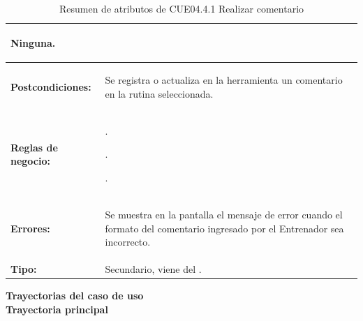 \begin{table}[H]
\begin{tabular}{| l | p{12 cm} |}
\begin{compactitem}
								\item Ninguna.
							\end{compactitem}\\
\hline
\textbf{Postcondiciones:} & \vspace{-2mm}	%
							\begin{compactitem}
								\setlength\itemsep{-0.25em}
								\item Se registra o actualiza en la herramienta un comentario en la rutina seleccionada.
							\end{compactitem}\\
\hline
\textbf{Reglas de negocio:} & \vspace{-2mm}	%
							\begin{compactitem}
								\setlength\itemsep{-0.25em}
								\item \nameref{rn:RNR25}.
								\item \nameref{rn:RNR26}.
								\item \nameref{rn:RNR27}.
								
							\end{compactitem}\\							
\hline
\textbf{Errores:} &	\vspace{-2mm}	%
					\begin{compactitem}
						\setlength\itemsep{-0.25em}
						\item Se muestra en la pantalla \nameref{pant:IUE04.4.1} el mensaje de error \nameref{msj:MSG13} cuando el formato del comentario ingresado por el Entrenador sea incorrecto.
					\end{compactitem}\\
\hline
\textbf{Tipo:} & Secundario, viene del \nameref{cu:CUE04.4}.\\
\hline	
\end{tabular}
\caption{Resumen de atributos de CUE04.4.1 Realizar comentario}
\label{tab:CUE04.4.1}
\end{table} 

\textbf{\textcolor[rgb]{0, 0, 0.545098}{Trayectorias del caso de uso}} \\

\textbf{\large{Trayectoria principal}}

